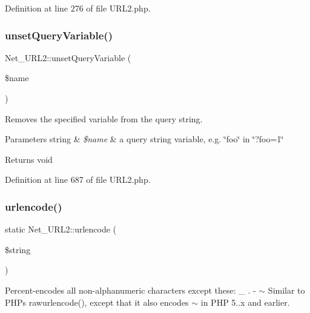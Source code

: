 Definition at line 276 of file U\+R\+L2.\+php.

\hypertarget{classNet__URL2_a2841fc0817045ec33688490613d6e64c}{}\label{classNet__URL2_a2841fc0817045ec33688490613d6e64c} 
\subsubsection{\texorpdfstring{unset\+Query\+Variable()}{unsetQueryVariable()}}
{\footnotesize\ttfamily Net\+\_\+\+U\+R\+L2\+::unset\+Query\+Variable (\begin{DoxyParamCaption}\item[{}]{\$name }\end{DoxyParamCaption})}

Removes the specified variable from the query string.


\begin{DoxyParams}[1]{Parameters}
string & {\em \$name} & a query string variable, e.\+g. \char`\"{}foo\char`\"{} in \char`\"{}?foo=1\char`\"{}\\
\hline
\end{DoxyParams}
\begin{DoxyReturn}{Returns}
void 
\end{DoxyReturn}


Definition at line 687 of file U\+R\+L2.\+php.

\hypertarget{classNet__URL2_ab870de85228bfe185ce8a208c0438c43}{}\label{classNet__URL2_ab870de85228bfe185ce8a208c0438c43} 
\subsubsection{\texorpdfstring{urlencode()}{urlencode()}}
{\footnotesize\ttfamily static Net\+\_\+\+U\+R\+L2\+::urlencode (\begin{DoxyParamCaption}\item[{}]{\$string }\end{DoxyParamCaption})\hspace{0.3cm}{\ttfamily [static]}}

Percent-\/encodes all non-\/alphanumeric characters except these\+: \+\_\+ . -\/ $\sim$ Similar to P\+HP\textquotesingle{}s rawurlencode(), except that it also encodes $\sim$ in P\+HP 5..\+x and earlier.


